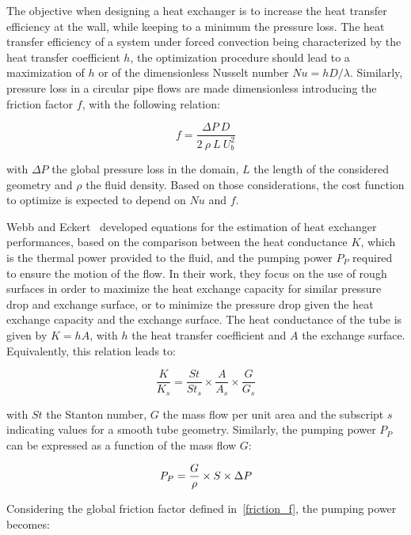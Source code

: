 The objective when designing a heat exchanger is to increase the heat transfer efficiency at the wall, while keeping to a minimum the pressure loss. The heat transfer efficiency of a system under forced convection being characterized by the heat transfer coefficient $h$, the optimization procedure should lead to a maximization of $h$ or of the dimensionless Nusselt number $Nu = hD/\lambda$. Similarly, pressure loss in a circular pipe flows are made dimensionless introducing the friction factor $f$, with the following relation:

\begin{equation}
f = \frac{\Delta P ~ D}{2 ~ \rho ~ L ~ U_b^2}
\label{friction_f}
\end{equation}

\noindent with $\Delta P$ the global pressure loss in the domain, $L$ the length of the considered geometry and $\rho$ the fluid density. Based on those considerations, the cost function to optimize is expected to depend on $Nu$ and $f$.

Webb and Eckert~\cite{webb1972} developed equations for the estimation of heat exchanger performances, based on the comparison between the heat conductance $K$, which is the thermal power provided to the fluid, and the pumping power $P_{P}$ required to ensure the motion of the flow. In their work, they focus on the use of rough surfaces in order to maximize the heat exchange capacity for similar pressure drop and exchange surface, or to minimize the pressure drop given the heat exchange capacity and the exchange surface. The heat conductance of the tube is given by $K=hA$, with $h$ the heat transfer coefficient and $A$ the exchange surface. Equivalently, this relation leads to:

\begin{equation}
\frac{K}{K_s} = \frac{St}{St_s} \times \frac{A}{A_s} \times \frac{G}{G_s}
\label{heat_conduct}
\end{equation}

\noindent with $St$ the Stanton number, $G$ the mass flow per unit area and the subscript $s$ indicating values for a smooth tube geometry. Similarly, the pumping power $P_{P}$ can be expressed as a function of the mass flow $G$:

\begin{equation}
P_{P} = \frac{G}{\rho} \times S \times \Delta P\\
\label{pump_pow}
\end{equation}

Considering the global friction factor defined in~\cref{friction_f}, the pumping power becomes:

